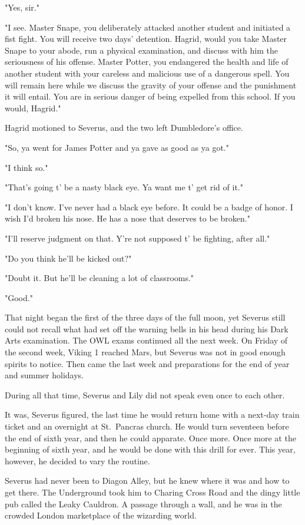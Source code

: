 "Yes, sir."

"I see. Master Snape, you deliberately attacked another student and initiated a fist fight. You will receive two days' detention. Hagrid, would you take Master Snape to your abode, run a physical examination, and discuss with him the seriousness of his offense. Master Potter, you endangered the health and life of another student with your careless and malicious use of a dangerous spell. You will remain here while we discuss the gravity of your offense and the punishment it will entail. You are in serious danger of being expelled from this school. If you would, Hagrid."

Hagrid motioned to Severus, and the two left Dumbledore's office.

"So, ya went for James Potter and ya gave as good as ya got."

"I think so."

"That's going t' be a nasty black eye. Ya want me t' get rid of it."

"I don't know. I've never had a black eye before. It could be a badge of honor. I wish I'd broken his nose. He has a nose that deserves to be broken."

"I'll reserve judgment on that. Y're not supposed t' be fighting, after all."

"Do you think he'll be kicked out?"

"Doubt it. But he'll be cleaning a lot of classrooms."

"Good."

That night began the first of the three days of the full moon, yet Severus still could not recall what had set off the warning bells in his head during his Dark Arts examination. The OWL exams continued all the next week. On Friday of the second week, Viking 1 reached Mars, but Severus was not in good enough spirits to notice. Then came the last week and preparations for the end of year and summer holidays.

During all that time, Severus and Lily did not speak even once to each other.

It was, Severus figured, the last time he would return home with a next-day train ticket and an overnight at St.~Pancras church. He would turn seventeen before the end of sixth year, and then he could apparate. Once more. Once more at the beginning of sixth year, and he would be done with this drill for ever. This year, however, he decided to vary the routine.

Severus had never been to Diagon Alley, but he knew where it was and how to get there. The Underground took him to Charing Cross Road and the dingy little pub called the Leaky Cauldron. A passage through a wall, and he was in the crowded London marketplace of the wizarding world.


